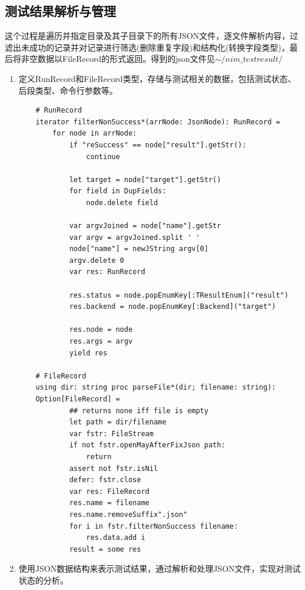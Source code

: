 \documentclass[UTF8]{ctexart}
\begin{document}
	\subsection{测试结果解析与管理} %
	这个过程是遍历并指定目录及其子目录下的所有JSON文件，逐文件解析内容，过滤出未成功的记录并对记录进行筛选(删除重复字段)和结构化(转换字段类型)，最后将非空数据以FileRecord的形式返回。得到的json文件见\href{run:../testresult/}{$ \sim/nim\_testresult/ $} %
	\begin{enumerate}[leftmargin=3.5em]
		\item 定义RunRecord和FileRecord类型，存储与测试相关的数据，包括测试状态、后段类型、命令行参数等。
		\begin{tcolorbox}[colback=gray!20, colframe=gray!20, rounded corners, boxrule=-5pt, width=0.74\textwidth, left=0pt, right=0pt, top=0pt, bottom=0pt]
			\begin{verbatim}
	# RunRecord
	iterator filterNonSuccess*(arrNode: JsonNode): RunRecord =
		for node in arrNode:
			if "reSuccess" == node["result"].getStr():
				continue
						
			let target = node["target"].getStr()
			for field in DupFields:
				node.delete field
						
			var argvJoined = node["name"].getStr
			var argv = argvJoined.split ' '
			node["name"] = newJString argv[0]
			argv.delete 0
			var res: RunRecord
					
			res.status = node.popEnumKey[:TResultEnum]("result")
			res.backend = node.popEnumKey[:Backend]("target")
					
			res.node = node
			res.args = argv
			yield res
					
	# FileRecord
	using dir: string proc parseFile*(dir; filename: string):
	Option[FileRecord] =
			## returns none iff file is empty
			let path = dir/filename
			var fstr: FileStream
			if not fstr.openMayAfterFixJson path:
				return
			assert not fstr.isNil
			defer: fstr.close
			var res: FileRecord
			res.name = filename
			res.name.removeSuffix".json"
			for i in fstr.filterNonSuccess filename:
				res.data.add i
			result = some res
			\end{verbatim}
		\end{tcolorbox}
		\item 使用JSON数据结构来表示测试结果，通过解析和处理JSON文件，实现对测试状态的分析。
	\end{enumerate}
\end{document}
